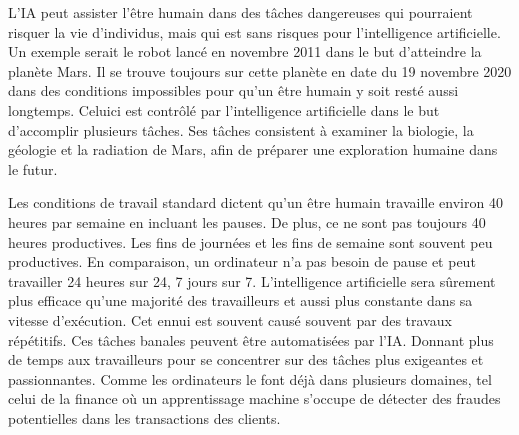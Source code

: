 \documentclass[letterpaper,10pt,french]{sphinxmanual}
\begin{document}
L’IA peut assister l’être humain dans des tâches dangereuses qui pourraient risquer
la vie d’individus, mais qui est sans risques pour l’intelligence artificielle.
Un exemple serait le robot  lancé en novembre 2011 dans le but d’atteindre
la planète Mars. Il se trouve toujours sur cette planète en date du 19 novembre
2020 dans des conditions impossibles pour qu’un être humain y soit resté aussi
longtemps. Celui\sphinxhyphen{}ci est contrôlé par l’intelligence artificielle dans le but
d’accomplir plusieurs tâches. Ses tâches consistent à examiner la biologie, la
géologie  et la radiation de Mars, afin de préparer une exploration humaine dans le futur.

Les conditions de travail standard dictent qu’un être humain travaille environ
40 heures par semaine en incluant les pauses. De plus, ce ne sont pas toujours
40 heures productives. Les fins de journées et les fins de semaine sont souvent
peu productives. En comparaison, un ordinateur n’a pas besoin de pause et peut
travailler 24 heures sur 24, 7 jours sur 7. L’intelligence artificielle sera
sûrement plus efficace qu’une majorité des travailleurs  et  aussi plus constante
dans sa vitesse d’exécution. Cet ennui est souvent causé souvent par des travaux
répétitifs. Ces tâches banales peuvent être automatisées par l’IA. Donnant plus de
temps aux travailleurs pour se concentrer sur des tâches plus exigeantes et passionnantes.
Comme les ordinateurs le font déjà dans plusieurs domaines, tel celui de la finance
où un apprentissage machine s’occupe de détecter des fraudes potentielles dans
les transactions des clients.
\end{document}
